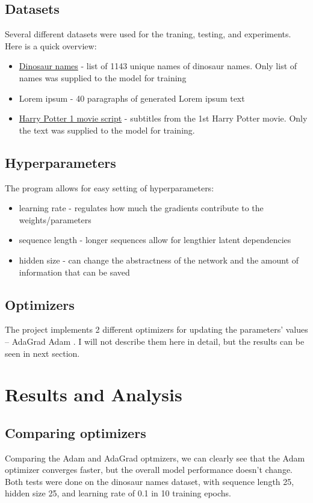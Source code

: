 \documentclass[11pt]{article}
\begin{document}
		\subsection{Datasets}
			Several different datasets were used for the traning, testing, and experiments. Here is a quick overview:
			\begin{itemize}
				\item \href{https://www.kaggle.com/kumazaki98/dinosaur-list}{Dinosaur names} - list of 1143 unique names of dinosaur names. Only list of names was supplied to the model for training
				\item Lorem ipsum - 40 paragraphs of generated Lorem ipsum text
				\item \href{https://www.kaggle.com/gulsahdemiryurek/harry-potter-dataset?select=Harry+Potter+1.csv}{Harry Potter 1 movie script} - subtitles from the 1st Harry Potter movie. Only the text was supplied to the model for training.
			\end{itemize}
		
		\subsection{Hyperparameters}
			The program allows for easy setting of hyperparameters:
			\begin{itemize}
				\item learning rate - regulates how much the gradients contribute to the weights/parameters
				\item sequence length - longer sequences allow for lengthier latent dependencies
				\item hidden size - can change the abstractness of the network and the amount of information that can be saved
			\end{itemize}
		
		\subsection{Optimizers}
			The project implements 2 different optimizers for updating the parameters' values -- AdaGrad \cite{duchi2011adaptive} Adam \cite{kingma2017adam}. I will not describe them here in detail, but the results can be seen in next section.
	
	\section{Results and Analysis} \label{sec:results}
		\subsection{Comparing optimizers}
			Comparing the Adam and AdaGrad optmizers, we can clearly see that the Adam optimizer converges faster, but the overall model performance doesn't change. Both tests were done on the dinosaur names dataset, with sequence length 25, hidden size 25, and learning rate of 0.1 in 10 training epochs.
			
\end{document}
